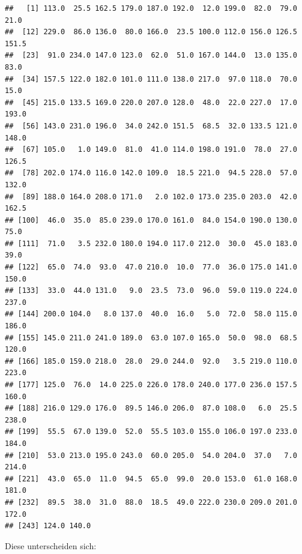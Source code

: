 \documentclass[12pt,ngerman,paper=a4,pagesize,DIV=13]{scrreprt}
\newenvironment{Shaded}{\begin{snugshade}}{\end{snugshade}}
\newcommand{\CommentTok}[1]{\textcolor[rgb]{0.56,0.35,0.01}{\textit{#1}}}
\newcommand{\DataTypeTok}[1]{\textcolor[rgb]{0.13,0.29,0.53}{#1}}
\newcommand{\KeywordTok}[1]{\textcolor[rgb]{0.13,0.29,0.53}{\textbf{#1}}}
\newcommand{\NormalTok}[1]{#1}
\newcommand{\OperatorTok}[1]{\textcolor[rgb]{0.81,0.36,0.00}{\textbf{#1}}}
\newcommand{\StringTok}[1]{\textcolor[rgb]{0.31,0.60,0.02}{#1}}
\begin{document}
\begin{verbatim}
##   [1] 113.0  25.5 162.5 179.0 187.0 192.0  12.0 199.0  82.0  79.0  21.0
##  [12] 229.0  86.0 136.0  80.0 166.0  23.5 100.0 112.0 156.0 126.5 151.5
##  [23]  91.0 234.0 147.0 123.0  62.0  51.0 167.0 144.0  13.0 135.0  83.0
##  [34] 157.5 122.0 182.0 101.0 111.0 138.0 217.0  97.0 118.0  70.0  15.0
##  [45] 215.0 133.5 169.0 220.0 207.0 128.0  48.0  22.0 227.0  17.0 193.0
##  [56] 143.0 231.0 196.0  34.0 242.0 151.5  68.5  32.0 133.5 121.0 148.0
##  [67] 105.0   1.0 149.0  81.0  41.0 114.0 198.0 191.0  78.0  27.0 126.5
##  [78] 202.0 174.0 116.0 142.0 109.0  18.5 221.0  94.5 228.0  57.0 132.0
##  [89] 188.0 164.0 208.0 171.0   2.0 102.0 173.0 235.0 203.0  42.0 162.5
## [100]  46.0  35.0  85.0 239.0 170.0 161.0  84.0 154.0 190.0 130.0  75.0
## [111]  71.0   3.5 232.0 180.0 194.0 117.0 212.0  30.0  45.0 183.0  39.0
## [122]  65.0  74.0  93.0  47.0 210.0  10.0  77.0  36.0 175.0 141.0 150.0
## [133]  33.0  44.0 131.0   9.0  23.5  73.0  96.0  59.0 119.0 224.0 237.0
## [144] 200.0 104.0   8.0 137.0  40.0  16.0   5.0  72.0  58.0 115.0 186.0
## [155] 145.0 211.0 241.0 189.0  63.0 107.0 165.0  50.0  98.0  68.5 120.0
## [166] 185.0 159.0 218.0  28.0  29.0 244.0  92.0   3.5 219.0 110.0 223.0
## [177] 125.0  76.0  14.0 225.0 226.0 178.0 240.0 177.0 236.0 157.5 160.0
## [188] 216.0 129.0 176.0  89.5 146.0 206.0  87.0 108.0   6.0  25.5 238.0
## [199]  55.5  67.0 139.0  52.0  55.5 103.0 155.0 106.0 197.0 233.0 184.0
## [210]  53.0 213.0 195.0 243.0  60.0 205.0  54.0 204.0  37.0   7.0 214.0
## [221]  43.0  65.0  11.0  94.5  65.0  99.0  20.0 153.0  61.0 168.0 181.0
## [232]  89.5  38.0  31.0  88.0  18.5  49.0 222.0 230.0 209.0 201.0 172.0
## [243] 124.0 140.0
\end{verbatim}

Diese unterscheiden sich:

\begin{Shaded}
\end{Shaded}
\end{document}
